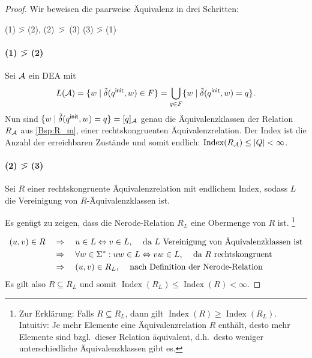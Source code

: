 \begin{proof}
  Wir beweisen die paarweise Äquivalenz in drei Schritten:

  \begin{center}
    (1) \=> (2), \quad \mbox{(2) \=> (3)}\quad {} \quad (3) \=> (1)
  \end{center}

        \paragraph{(1) \=> (2)} Sei $\mathcal{A}$ ein \ac{DEA} mit
  \begin{displaymath}
    L(\mathcal{A})=\{w \mid \tilde\delta(q^\mathsf{init},w)\in F \} = \bigcup_{q \in F} \{ w \mid \tilde\delta(q^\mathsf{init},w) = q\}.
\end{displaymath}
%
Nun sind $\{ w \mid \tilde\delta(q^\mathsf{init},w)=q \} = [q]_{\mathcal{A}}$ genau die Äquivalenzklassen der Relation $R_{\mathcal{A}}$ aus \autoref{Bsp:R_m}, einer rechtskongruenten Äquivalenzrelation.
Der Index ist die Anzahl der erreichbaren Zustände und somit endlich: $\operatorname{\operatorname{Index}}(R_{\mathcal{A}}) \le |Q| < \infty$.
        
\paragraph{(2) \=> (3)} Sei $R$ einer rechtskongruente Äquivalenzrelation mit endlichem Index, sodass $L$ die Vereinigung von $R$-Äquivalenzklassen ist.
        
Es genügt zu zeigen, dass die Nerode-Relation $R_L$ eine Obermenge von $R$ ist.%
\footnote{
Zur Erklärung: Falls $R \subseteq R_L$, dann gilt $\operatorname{Index}(R) \ge \operatorname{Index}(R_L)$.
Intuitiv: Je mehr Elemente eine Äquivalenzrelation $R$ enthält, desto mehr Elemente sind bzgl.\ dieser Relation äquivalent, d.h.\ desto weniger unterschiedliche Äquivalenzklassen gibt es.
}

\begin{align*}
(u, v) \in R & \quad\Rightarrow\quad u \in L \Leftrightarrow v \in L \text{, \quad da $L$ Vereinigung von Äquivalenzklassen ist} \\
& \quad\Rightarrow\quad \forall w \in \Sigma^*: uw \in L \Leftrightarrow vw \in L \text{, \quad da $R$ rechtskongruent } \\
& \quad\Rightarrow\quad (u, v) \in R_L \text{, \quad nach Definition der Nerode-Relation}
\end{align*}
Es gilt also $R \subseteq R_L$ und somit $\operatorname{Index}(R_L) \leq \operatorname{Index}(R)<\infty$.



\end{proof}
